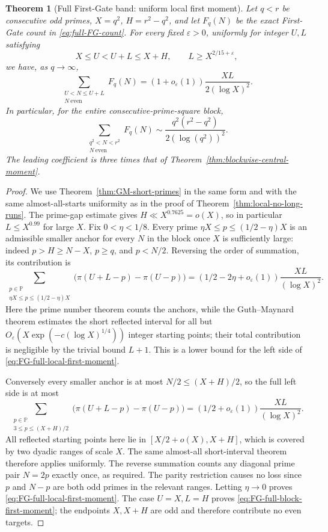 \documentclass[final,11pt]{elsarticle}
\newtheorem{theorem}{Theorem}[section]
\theoremstyle{definition}
\theoremstyle{remark}
\newcommand{\PP}{\mathbb{P}}
\newcommand{\eps}{\varepsilon}
\numberwithin{equation}{section}
\begin{document}
\begin{theorem}[Full First-Gate band: uniform local first moment]
\label{thm:full-FG-local}
Let $q<r$ be consecutive odd primes, $X=q^2$,
$H=r^2-q^2$, and let $F_q(N)$ be the exact First-Gate count in
\eqref{eq:full-FG-count}. For every fixed $\eps>0$, uniformly for
integer $U,L$ satisfying
\[
X\le U<U+L\le X+H,\qquad L\ge X^{2/15+\eps},
\]
we have, as $q\to\infty$,
\begin{equation}\label{eq:FG-full-local-first-moment}
\boxed{\displaystyle
\sum_{\substack{U<N\le U+L\\N\ \mathrm{even}}}F_q(N)
=(1+o_{\eps}(1))\frac{XL}{2(\log X)^2}.}
\end{equation}
In particular, for the entire consecutive-prime-square block,
\begin{equation}\label{eq:FG-full-block-first-moment}
\sum_{\substack{q^2<N<r^2\\N\ \mathrm{even}}}F_q(N)
\sim\frac{q^2(r^2-q^2)}{2(\log(q^2))^2}.
\end{equation}
The leading coefficient is three times that of
Theorem~\ref{thm:blockwise-central-moment}.
\end{theorem}
\begin{proof}
We use Theorem~\ref{thm:GM-short-primes} in the same form and
with the same almost-all-starts uniformity as in the proof of
Theorem~\ref{thm:local-no-long-runs}. The prime-gap estimate gives
$H\ll X^{0.7625}=o(X)$, so in particular $L\le X^{0.99}$
for large $X$.
Fix $0<\eta<1/8$. Every prime
$\eta X\le p\le(1/2-\eta)X$ is an admissible smaller
anchor for every $N$ in the block once $X$ is sufficiently large:
indeed $p>H\ge N-X$, $p\ge q$, and $p<N/2$.
Reversing the order of summation, its contribution is
\[
\sum_{\substack{p\in\PP\\\eta X\le p\le(1/2-\eta)X}}
\bigl(\pi(U+L-p)-\pi(U-p)\bigr)
=(1/2-2\eta+o_\eps(1))\frac{XL}{(\log X)^2}.
\]
Here the prime number theorem counts the anchors, while the
Guth--Maynard theorem estimates the short reflected interval for all
but $O_\eps(X\exp(-c(\log X)^{1/4}))$ integer starting points;
their total contribution is negligible by the trivial bound $L+1$.
This is a lower bound for the left side of
\eqref{eq:FG-full-local-first-moment}.

Conversely every smaller anchor is at most $N/2\le(X+H)/2$,
so the full left side is at most
\[
\sum_{\substack{p\in\PP\\3\le p\le(X+H)/2}}
\bigl(\pi(U+L-p)-\pi(U-p)\bigr)
=(1/2+o_\eps(1))\frac{XL}{(\log X)^2}.
\]
All reflected starting points here lie in $[X/2+o(X),X+H]$,
which is covered by two dyadic ranges of scale $X$. The same
almost-all short-interval theorem therefore applies uniformly.
The reverse summation counts any diagonal prime pair $N=2p$
exactly once, as required. The parity restriction causes no loss
since $p$ and $N-p$ are both odd primes in the relevant ranges. Letting $\eta\to0$ proves
\eqref{eq:FG-full-local-first-moment}. The case $U=X,L=H$
proves \eqref{eq:FG-full-block-first-moment}; the endpoints $X,X+H$
are odd and therefore contribute no even targets.
\end{proof}
\end{document}
